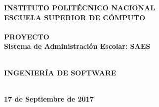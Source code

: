 \newpage
\begin{center}
\thispagestyle{empty}
\LARGE{\textsc {\textbf{INSTITUTO POLITÉCNICO NACIONAL}}}\\[0.5cm]
\Large{\textbf{ESCUELA SUPERIOR DE CÓMPUTO}}\\[0.7cm]
\vspace{5cm}
\Large{\textbf{\\PROYECTO}}
\LARGE{\textbf{\\Sistema de Administración Escolar: SAES\\}}
\vspace{7cm}
\end{center}
\Large{\textbf{\\INGENIERÍA DE SOFTWARE}}
\vspace{5cm}
\begin{flushright}
\Large{\textbf{\\17 de Septiembre de 2017}}
\end{flushright}
\newpage